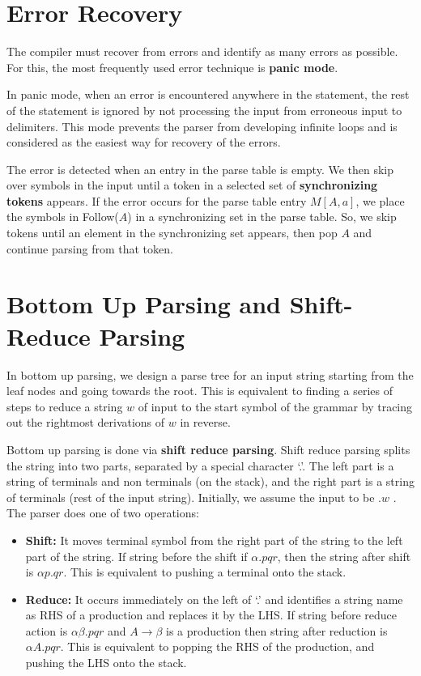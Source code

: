 \documentclass[12pt,letterpaper]{book}
\theoremstyle{definition}
\begin{document}
\section{Error Recovery}

The compiler must recover from errors and identify as many errors as possible. For this, the most frequently used error technique is \textbf{panic mode}.

In panic mode, when an error is encountered anywhere in the statement, the rest of the statement is ignored by not processing the input from erroneous input to delimiters. This mode prevents the parser from developing infinite loops and is considered as the easiest way for recovery of the errors.

The error is detected when an entry in the parse table is empty. We then skip over symbols in the input until a token in a selected set of \textbf{synchronizing tokens} appears. If the error occurs for the parse table entry $M[A,a]$, we place the symbols in Follow($A$) in a synchronizing set in the parse table. So, we skip tokens until an element in the synchronizing set appears, then pop $A$ and continue parsing from that token.

\section{Bottom Up Parsing and Shift-Reduce Parsing}

In bottom up parsing, we design a parse tree for an input string starting from the leaf nodes and going towards the root. This is equivalent to finding a series of steps to reduce a string $w$ of input to the start symbol of the grammar by tracing out the rightmost derivations of $w$ in reverse.

Bottom up parsing is done via \textbf{shift reduce parsing}. Shift reduce parsing splits the string into two parts,  separated by a special character `.'. The left part is a string of terminals and non terminals (on the stack), and the right part is a string of terminals (rest of the input string). Initially, we assume the input to be $.w$ . The parser does one of two operations:

\begin{itemize}
  \item \textbf{Shift:} It moves terminal symbol from the right part of the string to the left part of the string. If string before the shift if $\alpha . pqr$, then the string after shift is $\alpha p . q r$. This is equivalent to pushing a terminal onto the stack.
  \item \textbf{Reduce:} It occurs immediately on the left of `.' and identifies a string name as RHS of a production and replaces it by the LHS. If string before reduce action is $\alpha \beta . p q r$ and $A \rightarrow \beta$ is a production then string after reduction is $\alpha A . pqr$. This is equivalent to popping the RHS of the production, and pushing the LHS onto the stack.
\end{itemize}
\end{document}
